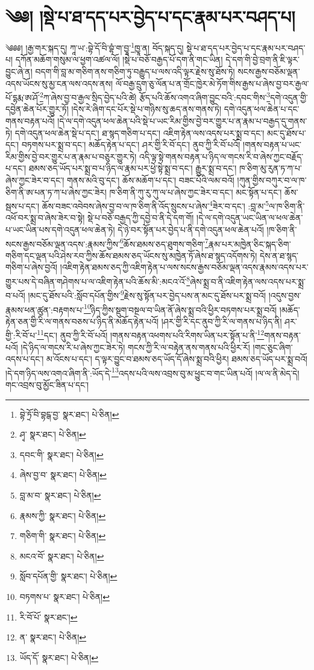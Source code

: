 \setcounter{footnote}{0} 
\chapter{༄༅། །སྡེ་པ་ཐ་དད་པར་བྱེད་པ་དང་རྣམ་པར་བཤད་པ།}༄༅༅། །རྒྱ་གར་སྐད་དུ། ཀཱ་ཡ་:བྷེ་དོ་བི་བྷཾ་ག་བྱཱ་\footnote{བྷེ་ཏྲོ་བི་བྷངྒ་བྱ་  སྣར་ཐང་།  པེ་ཅིན། }ཁྱཱ་ན། བོད་སྐད་དུ། སྡེ་པ་ཐ་དད་པར་བྱེད་པ་དང་རྣམ་པར་བཤད་པ། དཀོན་མཆོག་གསུམ་ལ་ཕྱག་འཚལ་ལོ། །སྡེ་པ་བཅོ་བརྒྱད་པོ་དག་ནི་གང་ཡིན། དེ་དག་གི་བྱེ་བྲག་ནི་ཇི་ལྟར་བྱུང་ཞེ་ན། བདག་གི་བླ་མ་གཅིག་ནས་གཅིག་ཏུ་བརྒྱུད་པ་ལས་འདི་ལྟར་རྗེས་སུ་ཐོས་ཏེ། སངས་རྒྱས་བཅོམ་ལྡན་འདས་ཡོངས་སུ་མྱ་ངན་ལས་འདས་ནས། ལོ་བརྒྱ་དྲུག་ཅུ་ལོན་པ་ན་གྲོང་ཁྱེར་མེ་ཏོག་གིས་རྒྱས་པ་ཞེས་བྱ་བར་རྒྱལ་པོ་དྷརྨ་ཨ་ཤོ་\footnote{ཤྭ་  སྣར་ཐང་།  པེ་ཅིན། }ཀ་ཞེས་བྱ་བ་རྒྱལ་སྲིད་བྱེད་པའི་ཚེ། རྩོད་པའི་ཆོས་འགའ་ཞིག་བྱུང་བའི་:དབང་གིས་\footnote{དབང་གི་  སྣར་ཐང་།  པེ་ཅིན། }དགེ་འདུན་གྱི་དབྱེན་ཆེན་པོར་གྱུར་ཏོ། །དེས་རེ་ཞིག་དང་པོར་སྡེ་པ་གཉིས་སུ་ཆད་ནས་གནས་ཏེ། དགེ་འདུན་ཕལ་ཆེན་པ་དང་གནས་བརྟན་པའོ། །དེ་ལ་དགེ་འདུན་ཕལ་ཆེན་པའི་སྡེ་པ་ཡང་རིམ་གྱིས་བྱེ་བར་གྱུར་པ་ན་རྣམ་པ་བརྒྱད་དུ་གནས་ཏེ། དགེ་འདུན་ཕལ་ཆེན་སྡེ་པ་དང་། ཐ་སྙད་གཅིག་པ་དང་། འཇིག་རྟེན་ལས་འདས་པར་སྨྲ་བ་དང་། མང་དུ་ཐོས་པ་དང་། བཏགས་པར་སྨྲ་བ་དང་། མཆོད་རྟེན་པ་དང་། ཤར་གྱི་རི་བོ་དང་། ནུབ་ཀྱི་རི་བོ་པའོ། །གནས་བརྟན་པ་ཡང་རིམ་གྱིས་བྱེ་བར་གྱུར་པ་ན་རྣམ་པ་བཅུར་གྱུར་ཏེ། འདི་ལྟ་སྟེ་གནས་བརྟན་པ་ཉིད་ལ་གངས་རི་བ་ཞེས་ཀྱང་བརྗོད་པ་དང་། ཐམས་ཅད་ཡོད་པར་སྨྲ་བ་པ་ཉིད་ལ་རྣམ་པར་ཕྱེ་སྟེ་སྨྲ་བ་དང་། རྒྱུར་སྨྲ་བ་དང་། ཁ་ཅིག་མུ་རུན་ཏ་ཀ་པ་ཞེས་ཀྱང་ཟེར་བ་དང་། གནས་མའི་བུ་དང་། ཆོས་མཆོག་པ་དང་། བཟང་པོའི་ལམ་བའོ། །ཀུན་གྱིས་བཀུར་བ་ལ་ཁ་ཅིག་ནི་ཨ་པན་ཏ་ཀ་པ་ཞེས་ཀྱང་ཟེར། ཁ་ཅིག་ནི་ཀུ་རུ་ཀུ་ལ་པ་ཞེས་ཀྱང་ཟེར་བ་དང་། མང་སྟོན་པ་དང་། ཆོས་སྦས་པ་དང་། ཆོས་བཟང་འབེབས་ཞེས་བྱ་བ་ལ་ཁ་ཅིག་ནི་འོད་སྲུངས་པ་ཞེས་\footnote{ཞེས་བྱ་བ་  སྣར་ཐང་།  པེ་ཅིན། }ཟེར་བ་དང་། :བླ་མ་\footnote{བླ་མ་བ་  སྣར་ཐང་།  པེ་ཅིན། }ལ་ཁ་ཅིག་ནི་འཕོ་བར་སྨྲ་བ་ཞེས་ཟེར་བ་སྟེ། སྡེ་པ་བཅོ་བརྒྱད་ཀྱི་དབྱེ་བ་ནི་དེ་དག་གོ། །དེ་ལ་དགེ་འདུན་ཡང་ཡིན་ལ་ཕལ་ཆེན་པ་ཡང་ཡིན་པས་དགེ་འདུན་ཕལ་ཆེན་ཏེ། དེ་ཉེ་བར་སྟོན་པར་བྱེད་པ་ནི་དགེ་འདུན་ཕལ་ཆེན་པའོ། །ཁ་ཅིག་ནི་སངས་རྒྱས་བཅོམ་ལྡན་འདས་:རྣམས་ཀྱིས་\footnote{རྣམས་ཀྱི་  སྣར་ཐང་།  པེ་ཅིན། }ཆོས་ཐམས་ཅད་ཐུགས་གཅིག་\footnote{གཅིག་གི་  སྣར་ཐང་།  པེ་ཅིན། }རྣམ་པར་མཁྱེན་ཅིང་སྐད་ཅིག་གཅིག་དང་ལྡན་པའི་ཤེས་རབ་ཀྱིས་ཆོས་ཐམས་ཅད་ཡོངས་སུ་མཁྱེན་ཏོ་ཞེས་ཐ་སྙད་འདོགས་ཏེ། དེས་ན་ཐ་སྙད་གཅིག་པ་ཞེས་བྱའོ། །འཇིག་རྟེན་ཐམས་ཅད་ཀྱི་འཇིག་རྟེན་པ་ལས་སངས་རྒྱས་བཅོམ་ལྡན་འདས་རྣམས་འདས་པར་གྱུར་པས་དེ་བཞིན་གཤེགས་པ་ལ་འཇིག་རྟེན་པའི་ཆོས་མི་:མངའ་འོ་\footnote{མངའ་བོ་  སྣར་ཐང་།  པེ་ཅིན། }ཞེས་སྨྲ་བ་ནི་འཇིག་རྟེན་ལས་འདས་པར་སྨྲ་བ་པའོ། །མང་དུ་ཐོས་པའི་:སློབ་དཔོན་གྱིས་\footnote{སློབ་དཔོན་གྱི་  སྣར་ཐང་།  པེ་ཅིན། }རྗེས་སུ་སྟོན་པར་བྱེད་པས་ན་མང་དུ་ཐོས་པར་སྨྲ་བའོ། །འདུས་བྱས་རྣམས་ཕན་ཚུན་:བརྟགས་པ་\footnote{བཏགས་པ་  སྣར་ཐང་།  པེ་ཅིན། }ཉིད་ཀྱིས་སྡུག་བསྔལ་བ་ཡིན་ནོ་ཞེས་སྨྲ་བའི་ཕྱིར་བཏགས་པར་སྨྲ་བའོ། །མཆོད་རྟེན་ཅན་གྱི་རི་ལ་གནས་བཅས་པ་ཉིད་ནི་མཆོད་རྟེན་པའོ། །ཤར་གྱི་རི་དང་ནུབ་ཀྱི་རི་ལ་གནས་པ་ཉིད་ནི། ཤར་གྱི་:རི་བོ་པ་\footnote{རི་བོ་པོ་  སྣར་ཐང་། }དང་། ནུབ་ཀྱི་རི་བོ་པའོ། །གནས་བརྟན་འཕགས་པའི་རིགས་ཡིན་པར་སྟོན་པ་ནི་\footnote{ན་  སྣར་ཐང་།  པེ་ཅིན། }གནས་བརྟན་པའོ། །དེ་ཉིད་ལ་གངས་རི་པ་ཞེས་ཀྱང་ཟེར་ཏེ། གངས་ཀྱི་རི་ལ་བརྟེན་ནས་གནས་པའི་ཕྱིར་རོ། །གང་ཅུང་ཞིག་འདས་པ་དང་། མ་འོངས་པ་དང་། ད་ལྟར་བྱུང་བ་ཐམས་ཅད་ཡོད་དོ་ཞེས་སྨྲ་བའི་ཕྱིར། ཐམས་ཅད་ཡོད་པར་སྨྲ་བའོ། །དེ་དག་ཉིད་ལས་འགའ་ཞིག་ནི་:ཡོད་དེ་\footnote{ཡོད་དོ་  སྣར་ཐང་།  པེ་ཅིན། }འདས་པའི་ལས་འབྲས་བུ་མ་ཕྱུང་བ་གང་ཡིན་པའོ། །ལ་ལ་ནི་མེད་དེ། གང་འབྲས་བུ་མྱོང་ཟིན་པ་དང་། 